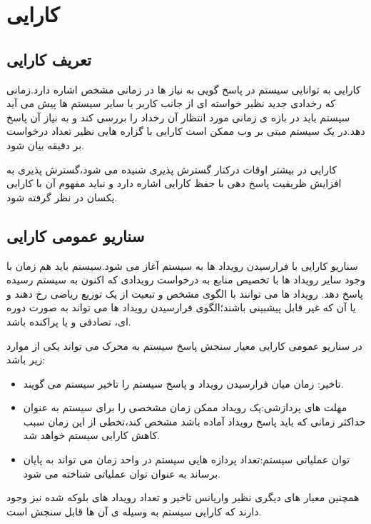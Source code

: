 \chapter{کارایی}
\section{تعریف کارایی}
کارایی به توانایی سیستم در پاسخ گویی به نیاز ها در زمانی مشخص اشاره دارد.زمانی که رخدادی جدید نظیر خواسته ای از جانب کاربر یا سایر سیستم ها پیش می آید سیستم باید در بازه ی زمانی مورد انتظار آن رخداد را بررسی کند و به نیاز آن پاسخ دهد.در یک سیستم مبتی بر وب ممکن است کارایی با گزاره هایی نظیر تعداد درخواست بر دقیقه بیان شود.

کارایی در بیشتر اوقات درکنار گسترش پذیری شنیده می شود،‌گسترش پذیری به افزایش ظریفیت پاسخ دهی با حفظ کارایی اشاره دارد و نباید مفهوم آن با کارایی یکسان در نظر گرفته شود.
\section{سناریو عمومی کارایی}
سناریو کارایی با فرارسیدن رویداد ها به سیستم آغاز می شود.سیستم باید هم زمان با وجود سایر رویداد ها با تخصیص منابع به درخواست رویدادی که اکنون به سیستم رسیده پاسخ دهد.
رویداد ها می توانند با الگوی مشخص و تبعیت از یک توزیع ریاضی رخ دهند و یا آن که غیر قابل پیشبینی باشند؛‌الگوی فرارسیدن رویداد ها می تواند به صورت دوره ای، تصادفی و یا پراکنده باشد.

در سناریو عمومی کارایی معیار سنجش پاسخ سیستم به محرک می تواند یکی از موارد زیر باشد:
\begin{itemize}
\item
تاخیر: زمان میان فرارسیدن رویداد و پاسخ سیستم را تاخیر سیستم می گویند.
\item
مهلت های پردازشی:یک رویداد ممکن زمان مشخصی را برای سیستم به عنوان حداکثر زمانی که باید پاسخ رویداد آماده باشد مشخص کند،‌تخطی از این زمان سبب کاهش کارایی سیستم خواهد شد.
\item
توان عملیاتی سیستم:تعداد پردازه هایی سیستم در واحد زمان می تواند به پایان برساند به عنوان توان عملیاتی شناخته می شود.
\end{itemize}
همچنین معیار های دیگری نظیر واریانس تاخیر و تعداد رویداد های بلوکه شده نیز وجود دارند که کارایی سیستم به وسیله ی آن ها قابل سنجش است.

